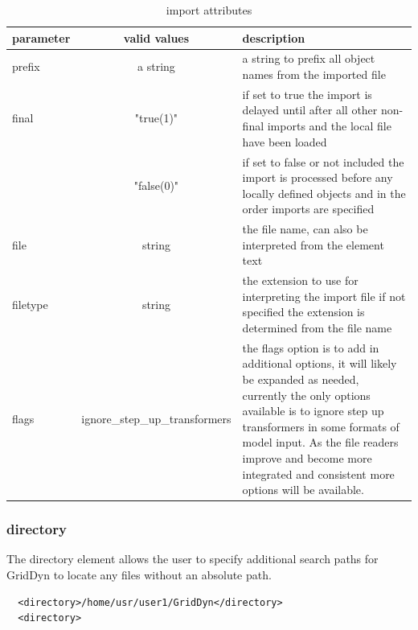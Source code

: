 \documentclass[12pt]{article} %
\begin{document}
   \begin{table}[ht]
   	
   	\caption{import attributes} %
   	\centering %
   	\begin{tabular}{l c p{8cm}} %
   		\hline %
   		parameter & valid values & description \\ [0.5ex] %
   		\hline %
   		prefix & a string & a string to prefix all object names from the imported file \\ %
   		final & "true(1)"  & if set to true the import is delayed until after all other non-final imports and the local file have been loaded\\
   		& "false(0)"&  if set to false or not included the import is processed before any locally defined objects and in the order imports are specified \\
   		file & string & the file name, can also be interpreted from the element text  \\
   		filetype & string & the extension to use for interpreting the import file if not specified the extension is determined from the file name \\
   		flags & ignore\_step\_up\_transformers & the flags option is to add in additional options, it will likely be expanded as needed, currently the only options available is to ignore step up transformers in some formats of model input.  As the file readers improve and become more integrated and consistent more options will be available.  \\
   		\hline %
   	\end{tabular}
   	\label{table:importOptions}
   \end{table}
   
  \subsubsection{directory}
  The directory element allows the user to specify additional search paths for GridDyn to locate any files without an absolute path. 
  \begin{verbatim}
  <directory>/home/usr/user1/GridDyn</directory>
  <directory>
  \end{verbatim}
  
  \clearpage
\end{document}

